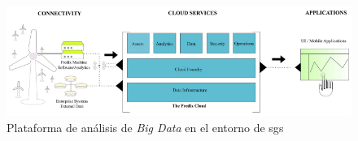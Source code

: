 \begin{figure}[h!]
  \centering
  \includegraphics[width=1\textwidth]{img/teoria/bigdata.png}
  \caption{Plataforma de análisis de \textit{Big Data} en el entorno de \gls{sg}s \cite{bigdata}}
  \label{fig:bigdata}
\end{figure}

\vspace{3mm}









\vspace{3mm}



















